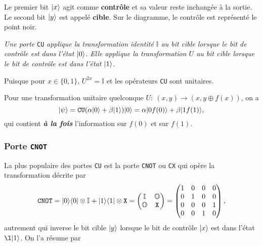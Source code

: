 Le premier bit $\vert x\rangle$ agit comme \textbf{contrôle} et sa valeur reste
inchangée à la sortie. Le second bit $\vert y\rangle$ est appelé \textbf{cible}.  Sur
le diagramme, le contrôle est représenté le point noir.

\medskip\colorbox[gray]{0.8}{
\parbox[c]{0.9\textwidth}{
\emph{Une porte} \texttt{CU} \emph{applique la transformation identité
$\mathbb{I}$ au bit cible lorsque le bit de contrôle est dans l'état $\vert0\rangle$.
Elle applique la transformation $U$ au bit cible lorsque le bit de contrôle est
dans l'état $\vert1\rangle$.}
}}\medskip

Puisque pour $x\in\{0,1\}$, $U^{2x}=\mathbb{I}$ et les opérateurs \texttt{CU}
sont unitaires.

Pour une transformation unitaire quelconque $U:\ (x,y)\rightarrow(x,y\oplus
f(x))$, on a%
\begin{equation}
\ket{\psi}=\mathtt{CU}(\alpha\ket{0}+\beta\ket{1})\ket{0} =\alpha\ket{0f(0)}
+\beta\ket{1f(1)},
\label{eq:PhiCU}%
\end{equation}
qui contient \textbf{\emph{à la fois}} l'information sur $f(0)$ et sur $f(1)$.

\subsubsection{Porte \texttt{CNOT}}

La plus populaire des portes \texttt{CU} est la porte \texttt{CNOT} ou
\texttt{CX} qui opère la transformation décrite par %
\begin{equation}
\mathtt{CNOT}=\vert0\rangle\langle0\vert\otimes\mathbb{I}+\vert1\rangle\langle1\vert\otimes\mathtt{X} =
\begin{pmatrix}
\mathbb{I} & \mathbb{O}\\
\mathbb{O} & \mathtt{X}
\end{pmatrix}
=\begin{pmatrix}
1 & 0 & 0 & 0\\
0 & 1 & 0 & 0\\
0 & 0 & 0 & 1\\
0 & 0 & 1 & 0
\end{pmatrix},
\end{equation}
autrement qui inverse le bit cible $\vert y\rangle$ lorsque le bit de contrôle
$\vert x\rangle$ est dans l'état $\l\ket{1}$. On l'a résume par

